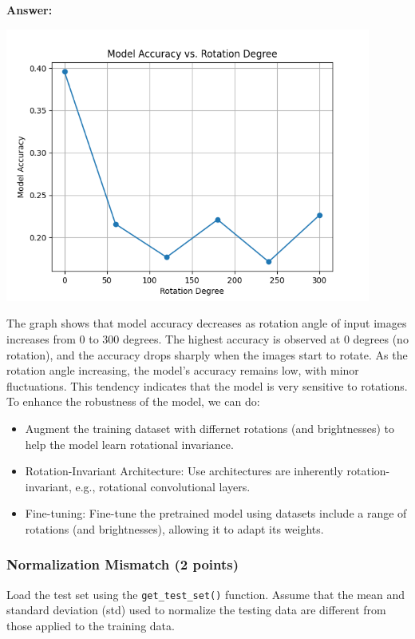 \documentclass[11pt, oneside]{article}   	%
\begin{document}
\textbf{Answer:} \\
\begin{center}
    \includegraphics[width=0.9\textwidth]{report_pic/Rotation_accuracy.png}
\end{center}
The graph shows that model accuracy decreases as rotation angle of input images increases from 0 to 300 degrees.
The highest accuracy is observed at 0 degrees (no rotation), and the accuracy drops sharply when the images start to rotate.
As the rotation angle increasing, the model's accuracy remains low, with  minor fluctuations. 
This tendency indicates that the model is very sensitive to rotations. 
\\
To enhance the robustness of the model, we can do:
\begin{itemize}
    \item Augment the training dataset with differnet rotations (and brightnesses) to help the model learn rotational invariance.
    \item Rotation-Invariant Architecture: Use architectures are inherently rotation-invariant, e.g., rotational convolutional layers.
    \item Fine-tuning: Fine-tune the pretrained model using datasets include a range of rotations (and brightnesses), allowing it to adapt its weights.
\end{itemize}

\subsubsection*{Normalization Mismatch (2 points)}

Load the test set using the \texttt{get\_test\_set()} function. Assume that the mean and standard deviation (std) used to normalize the testing data are different from those applied to the training data.
\end{document}
